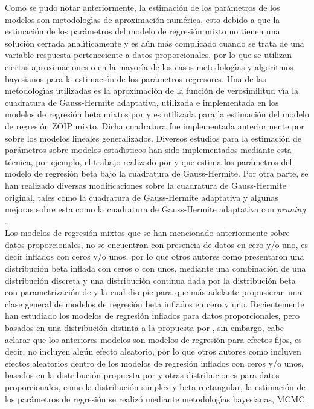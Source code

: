 Como se pudo notar anteriormente, la estimaci\'{o}n de los par\'{a}metros de los modelos son metodolog\'{\i}as de aproximaci\'{o}n num\'{e}rica, esto debido a que la estimaci\'{o}n de los pa\-r\'{a}\-me\-tros del modelo de regresi\'{o}n mixto no tienen una soluci\'{o}n cerrada anal\'{\i}ticamente y es a\'{u}n m\'{a}s complicado cuando se trata de una variable respuesta perteneciente a datos proporcionales, por lo que se utilizan ciertas aproximaciones o en la mayor\'{\i}a de los casos metodolog\'{\i}as y algoritmos bayesianos para la estimaci\'{o}n de los par\'{a}metros regresores. Una de las metodolog\'{\i}as utilizadas es la aproximaci\'{o}n de la funci\'{o}n de verosimilitud v\'{\i}a la cuadratura de Gauss-Hermite adaptativa, utilizada e implementada en los modelos de regresi\'{o}n beta mixtos por \cite{Usuga1} y es utilizada para la estimaci\'{o}n del modelo de regresi\'{o}n ZOIP mixto. Dicha cuadratura fue implementada anteriormente por \cite{Fahrmeir1} sobre los modelos lineales generalizados. Diversos estudios para la estimaci\'{o}n de par\'{a}metros sobre modelos estad\'{\i}sticos han sido implementados mediante esta t\'{e}cnica, por ejemplo, el trabajo realizado por \cite{Liu1} y \cite{Smithson1} que estima los par\'{a}metros del modelo de regresi\'{o}n beta bajo la cuadratura de Gauss-Hermite. Por otra parte, se han realizado diversas modificaciones sobre la cuadratura de Gauss-Hermite original, tales como la cuadratura de Gauss-Hermite adaptativa y algunas mejoras sobre esta como la cuadratura de Gauss-Hermite adaptativa con \textit{pruning} \citep{Hernandez1}.\\

Los modelos de regresi\'{o}n mixtos que se han mencionado anteriormente sobre datos proporcionales, no se encuentran con presencia de datos en cero y/o uno, es decir inflados con ceros y/o unos, por lo que otros autores como \cite{Ospina2} presentaron una distribuci\'{o}n beta inflada con ceros o con unos, mediante una combinaci\'{o}n de una distribuci\'{o}n discreta y una distribuci\'{o}n continua dada por la distribuci\'{o}n beta con parametrizaci\'{o}n de \cite{Ferrari2} y la cual dio pie para que m\'{a}s adelante \cite{Ospina1} propusieran una clase general de modelos de regresi\'{o}n beta inflados en cero y uno. Recientemente \cite{Kosmidis1} han estudiado los modelos de regresi\'{o}n inflados para datos proporcionales, pero basados en una distribuci\'{o}n distinta a la propuesta por \cite{Ospina1}, sin embargo, cabe aclarar que los anteriores modelos son modelos de regresi\'{o}n para efectos fijos, es decir, no incluyen alg\'{u}n efecto aleatorio, por lo que otros autores como \cite{Galvis1} incluyen efectos aleatorios dentro de los modelos de regresi\'{o}n inflados con ceros y/o unos, basados en la distribuci\'{o}n propuesta por \cite{Ospina2} y otras distribuciones para datos proporcionales, como la distribuci\'{o}n simplex y beta-rectangular, la estimaci\'{o}n de los par\'{a}metros de regresi\'{o}n se realiz\'{o} mediante metodolog\'{\i}as bayesianas, MCMC.\\

